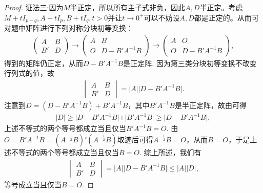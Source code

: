 \documentclass[../../main.tex]{subfiles}%
\begin{document}
\begin{proof}
{\color{blue}证法三:}因为$M$半正定，所以所有主子式非负，因此$A,D$半正定。考虑$M + tI_{p+q}, A + tI_p, B + tI_q, t > 0$并让$t \to 0^+$可以不妨设$A,D$都是正定的。从而可对题中矩阵进行下列对称分块初等变换：
\begin{align*}
\begin{pmatrix}A&B\\B'&D\end{pmatrix}\to\begin{pmatrix}A&B\\O&D - B'A^{-1}B\end{pmatrix}\to\begin{pmatrix}A&O\\O&D - B'A^{-1}B\end{pmatrix},
\end{align*}
得到的矩阵仍正定，从而\(D - B'A^{-1}B\)是正定阵. 因为第三类分块初等变换不改变行列式的值，故
\begin{align*}
\begin{vmatrix}A&B\\B'&D\end{vmatrix}=\vert A\vert\vert D - B'A^{-1}B\vert.
\end{align*}
注意到\(D=(D - B'A^{-1}B)+B'A^{-1}B\)，其中\(B'A^{-1}B\)是半正定阵，故由可得
\begin{align*}
\vert D\vert\geqslant \vert D - B'A^{-1}B\vert+\vert B'A^{-1}B\vert\geqslant \vert D - B'A^{-1}B\vert,
\end{align*}
上述不等式的两个等号都成立当且仅当\(B'A^{-1}B = O\). 由\(O = B'A^{-1}B=(A^{-\frac{1}{2}}B)'(A^{-\frac{1}{2}}B)\)取迹后可得\(A^{-\frac{1}{2}}B = O\)，从而\(B = O\)，于是上述不等式的两个等号都成立当且仅当\(B = O\). 综上所述，我们有
\begin{align*}
\begin{vmatrix}A&B\\B'&D\end{vmatrix}=\vert A\vert\vert D - B'A^{-1}B\vert\leqslant \vert A\vert\vert D\vert,
\end{align*}
等号成立当且仅当\(B = O\). 

\end{proof}
\end{document}
